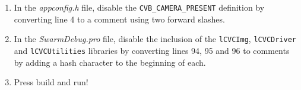 \begin{enumerate}
 \item In the \textit{appconfig.h} file, disable the \texttt{CVB\_CAMERA\_PRESENT} definition by converting line 4 to a comment using two forward slashes.
 \item In the \textit{SwarmDebug.pro} file, disable the inclusion of the \texttt{lCVCImg}, \texttt{lCVCDriver} and \texttt{lCVCUtilities} libraries by converting lines 94, 95 and 96 to comments by adding a hash character to the beginning of each.
 \item Press build and run!
\end{enumerate}